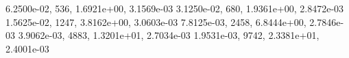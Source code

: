 6.2500e-02,   536, 1.6921e+00, 3.1569e-03 
3.1250e-02,   680, 1.9361e+00, 2.8472e-03 
1.5625e-02,  1247, 3.8162e+00, 3.0603e-03 
7.8125e-03,  2458, 6.8444e+00, 2.7846e-03 
3.9062e-03,  4883, 1.3201e+01, 2.7034e-03 
1.9531e-03,  9742, 2.3381e+01, 2.4001e-03 
